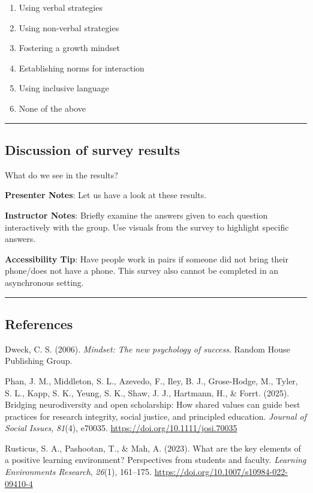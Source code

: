 \documentclass[
  letterpaper,
  DIV=11,
  numbers=noendperiod]{scrartcl}
\newlength{\cslhangindent}
\newenvironment{CSLReferences}[2] %
 {\begin{list}{}{%
  \setlength{\itemindent}{0pt}
  \setlength{\leftmargin}{0pt}
  \setlength{\parsep}{0pt}
  \ifodd #1
   \setlength{\leftmargin}{\cslhangindent}
   \setlength{\itemindent}{-1\cslhangindent}
  \fi
  \setlength{\itemsep}{#2\baselineskip}}}
 {\end{list}}
\begin{document}
\begin{enumerate}
\def\labelenumi{\alph{enumi}.}
\item
  Using verbal strategies
\item
  Using non-verbal strategies
\item
  Fostering a growth mindset
\item
  Establishing norms for interaction
\item
  Using inclusive language
\item
  None of the above
\end{enumerate}

\begin{center}\rule{0.5\linewidth}{0.5pt}\end{center}

\subsection{Discussion of survey
results}\label{discussion-of-survey-results-1}

What do we see in the results?

\textbf{Presenter Notes}: Let us have a look at these results.

\textbf{Instructor Notes}: Briefly examine the answers given to each
question interactively with the group. Use visuals from the survey to
highlight specific answers.

\textbf{Accessibility Tip}: Have people work in pairs if someone did not
bring their phone/does not have a phone. This survey also cannot be
completed in an asynchronous setting.

\begin{center}\rule{0.5\linewidth}{0.5pt}\end{center}

\subsection{References}\label{references}

\protect{}\label{refs}
\begin{CSLReferences}{1}{0}
Dweck, C. S. (2006). \emph{Mindset: {The} new psychology of success}.
Random House Publishing Group.

Phan, J. M., Middleton, S. L., Azevedo, F., Iley, B. J., Grose-Hodge,
M., Tyler, S. L., Kapp, S. K., Yeung, S. K., Shaw, J. J., Hartmann, H.,
\& Forrt. (2025). Bridging neurodiversity and open scholarship: {How}
shared values can guide best practices for research integrity, social
justice, and principled education. \emph{Journal of Social Issues},
\emph{81}(4), e70035. \url{https://doi.org/10.1111/josi.70035}

Rusticus, S. A., Pashootan, T., \& Mah, A. (2023). What are the key
elements of a positive learning environment? {Perspectives} from
students and faculty. \emph{Learning Environments Research},
\emph{26}(1), 161--175. \url{https://doi.org/10.1007/s10984-022-09410-4}

\end{CSLReferences}
\end{document}
